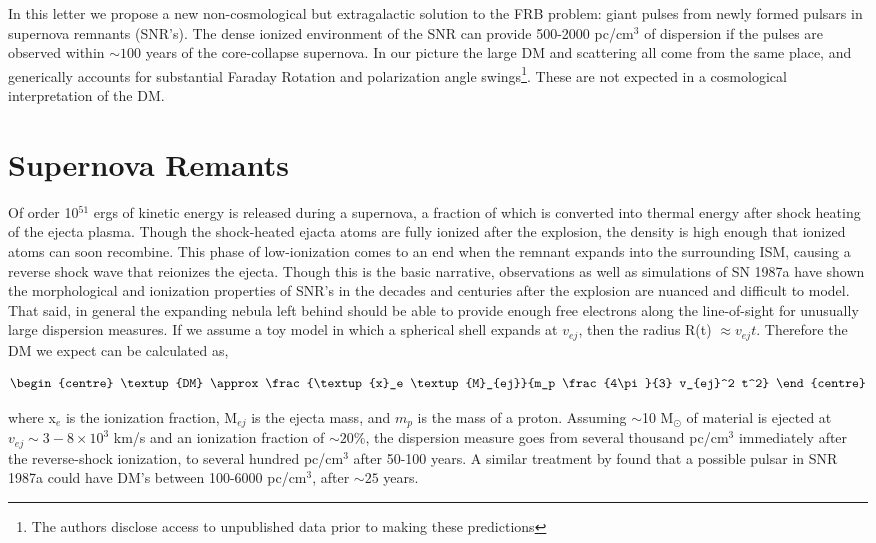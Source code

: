 \documentclass[useAMS,usenatbib]{mn2e}
\begin{document}
In this letter we propose a new non-cosmological but extragalactic
solution to the FRB problem: giant pulses from newly formed pulsars in 
supernova remnants (SNR's). The dense ionized environment of the SNR
can provide 500-2000 pc/cm$^3$ of dispersion if the pulses are observed 
within $\sim100$ years of the core-collapse supernova. In our picture the 
large DM and scattering all come from the same place, and generically
accounts for substantial Faraday Rotation and polarization angle
swings\footnote{\label{disclosure}The authors disclose access to unpublished data prior
  to making these predictions}.
These are not expected in a cosmological interpretation of the DM.



\section{Supernova Remants}
Of order 10$^{51}$ ergs of kinetic energy is released during a supernova, a 
fraction of which is converted into thermal 
energy after shock heating of the 
ejecta plasma. Though the shock-heated ejacta atoms 
are fully ionized after the explosion, the density is high enough that
ionized atoms can soon recombine.
This phase of low-ionization comes to an end when the remnant expands 
into the surrounding ISM, causing a reverse shock wave that reionizes the ejecta.
Though this is the basic narrative, observations \citep{2014ApJ...796...82Z} 
as well as simulations \citep{2014ApJ...794..174P}
of SN 1987a have shown the morphological and ionization properties of SNR's
in the decades and centuries after the explosion are nuanced and 
difficult to model.
That said, in general the expanding nebula left behind 
should be able to provide enough free electrons
along the line-of-sight for unusually large dispersion measures. If we 
assume a toy model in which a spherical shell expands at $v_{ej}$, 
then the radius R(t) $\approx v_{ej} t$. Therefore the DM we expect can be 
calculated as,

\begin{equation}
\begin{centre}
\textup{DM} \approx  \frac{\textup{x}_e \textup{M}_{ej}}{m_p \frac{4\pi}{3} v_{ej}^2 t^2}
\end{centre}
\end{equation}

\noindent where x$_e$ is the ionization fraction, 
M$_{ej}$ is the ejecta mass, and $m_p$ 
is the mass of a proton. Assuming $\sim$10 M$_{\odot}$ of material 
is ejected at $v_{ej}\sim 3-8\times10^3$ km/s and an ionization fraction of 
$\sim 20\% $, the dispersion measure goes from several 
thousand pc/cm$^3$ immediately
after the reverse-shock ionization, to several hundred pc/cm$^3$ after 50-100 years.
A similar treatment by \cite{2014ApJ...796...82Z} found that a possible pulsar in SNR 
1987a could have DM's between 100-6000 pc/cm$^3$, after $\sim 25$ years.
\end{document}
